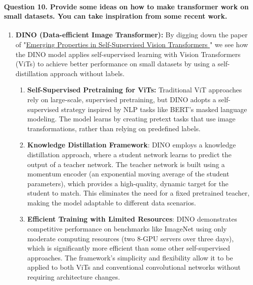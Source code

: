 \documentclass{article}
\begin{document}
\paragraph{Question 10. Provide some ideas on how to make transformer work on small datasets. You can take inspiration from some recent work. }
\begin{enumerate}
    \item \textbf{DINO (Data-efficient Image Transformer):}
By digging down the paper of "\href{https://doi.org/10.48550/arXiv.2104.14294}{Emerging Properties in Self-Supervised Vision Transformers
}" we see how the DINO model applies self-supervised learning with Vision Transformers (ViTs) to achieve better performance on small datasets by using a self-distillation approach without labels. 
\begin{enumerate}
    \item \textbf{Self-Supervised Pretraining for ViTs: }Traditional ViT approaches rely on large-scale, supervised pretraining, but DINO adopts a self-supervised strategy inspired by NLP tasks like BERT’s masked language modeling. The model learns by creating pretext tasks that use image transformations, rather than relying on predefined labels. 
    \item \textbf{Knowledge Distillation Framework}: DINO employs a knowledge distillation approach, where a student network learns to predict the output of a teacher network. The teacher network is built using a momentum encoder (an exponential moving average of the student parameters), which provides a high-quality, dynamic target for the student to match. This eliminates the need for a fixed pretrained teacher, making the model adaptable to different data scenarios. 
    \item \textbf{Efficient Training with Limited Resources}: DINO demonstrates competitive performance on benchmarks like ImageNet using only moderate computing resources (two 8-GPU servers over three days), which is significantly more efficient than some other self-supervised approaches. The framework's simplicity and flexibility allow it to be applied to both ViTs and conventional convolutional networks without requiring architecture changes. 


\end{enumerate}
\end{enumerate}
\end{document}
